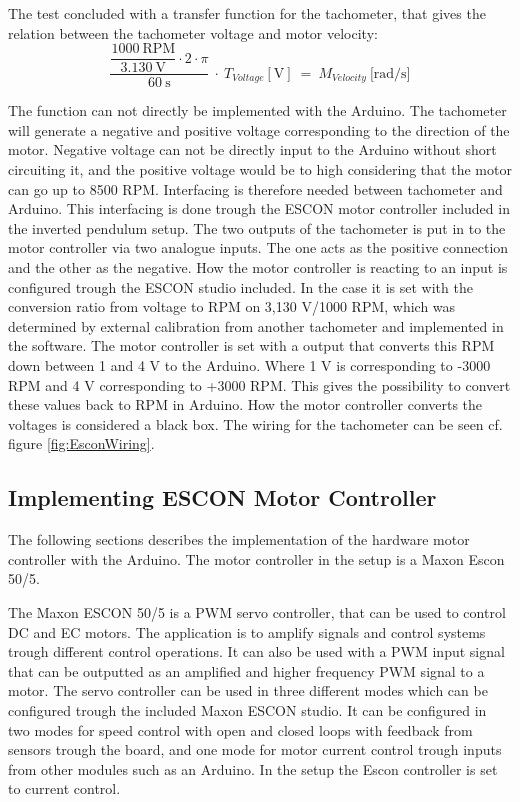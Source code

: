 The test concluded with a transfer function for the tachometer, that gives the relation between the tachometer voltage and motor velocity:
\begin{equation}
\dfrac{\dfrac{1000\ \text{RPM}}{3.130\ \text{V}} \cdot 2 \cdot \pi}{60\ \text{s}}\ \cdot\ T_{Voltage}[\text{V}]\ =\ M_{Velocity}\ \text{[rad/s]}
\end{equation}


The function can not directly be implemented with the Arduino. The tachometer will generate a negative and positive voltage corresponding to the direction of the motor. Negative voltage can not be directly input to the Arduino without short circuiting it, and the positive voltage would be to high considering that the motor can go up to 8500 RPM. Interfacing is therefore needed between tachometer and Arduino.
This interfacing is done trough the ESCON motor controller included in the inverted pendulum setup. The two outputs of the tachometer is put in to the motor controller via two analogue inputs. The one acts as the positive connection and the other as the negative. How the motor controller is reacting to an input is configured trough the ESCON studio included. In the case it is set with the conversion ratio from voltage to RPM on 3,130 V/1000 RPM, which was determined by external calibration from another tachometer and implemented in the software.  The motor controller is set with a output that converts this RPM down between 1 and 4 V to the Arduino. Where 1 V is corresponding to -3000 RPM and 4 V corresponding to +3000 RPM. This gives the possibility to convert these values back to RPM in Arduino. How the motor controller converts the voltages is considered a black box. The wiring for the tachometer can be seen cf. figure \ref{fig:EsconWiring}. 


\subsection{Implementing ESCON Motor Controller}
The following sections describes the implementation of the hardware motor controller with the Arduino. The motor controller in the setup is a Maxon Escon 50/5.

The Maxon ESCON 50/5 is a PWM servo controller, that can be used to control DC and EC motors. The application is to amplify signals and control systems trough different control operations. It can also be used with a PWM input signal that can be outputted as an amplified and higher frequency PWM signal to a motor. The servo controller can be used in three different modes which can be configured trough the included Maxon ESCON studio. It can be configured in two modes for speed control with open and closed loops with feedback from sensors trough the board, and one mode for motor current control trough inputs from other modules such as an Arduino. In the setup the Escon controller is set to current control.


